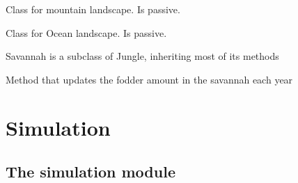 \documentclass[a4paper,10pt,english]{sphinxmanual}
\begin{document}

\begin{fulllineitems}
\label{\detokenize{landscape:biosim.landscape.Mountain}}
Class for mountain landscape. Is passive.

\end{fulllineitems}


\begin{fulllineitems}
\label{\detokenize{landscape:biosim.landscape.Ocean}}
Class for Ocean landscape. Is passive.

\end{fulllineitems}


\begin{fulllineitems}
\label{\detokenize{landscape:biosim.landscape.Savannah}}
Savannah is a subclass of Jungle, inheriting most of its methods

\begin{fulllineitems}
\label{\detokenize{landscape:biosim.landscape.Savannah.reset_fodder}}
Method that updates the fodder amount in the savannah each year

\end{fulllineitems}


\end{fulllineitems}



\chapter{Simulation}
\label{\detokenize{simulation:simulation}}\label{\detokenize{simulation::doc}}

\section{The simulation module}
\label{\detokenize{simulation:the-simulation-module}}\label{\detokenize{simulation:module-biosim.simulation}}
\end{document}
